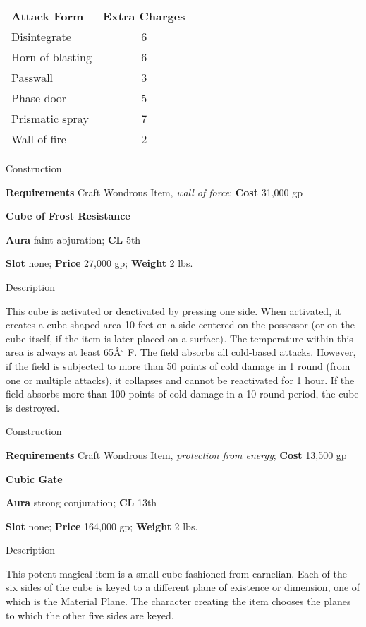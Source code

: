 \begin{tabular}{lc}
\textbf{Attack Form} & \textbf{Extra Charges}\\
Disintegrate & 6\\
Horn of blasting & 6\\
Passwall & 3\\
Phase door & 5\\
Prismatic spray & 7 \\
Wall of fire & 2\\
\end{tabular}
				
Construction
				
\textbf{Requirements} Craft Wondrous Item, \textit{wall of force}; \textbf{Cost }31,000 gp
				
\textbf{Cube of Frost Resistance}
				
\textbf{Aura} faint abjuration;\textbf{ CL }5th
				
\textbf{Slot} none; \textbf{Price} 27,000 gp; \textbf{Weight }2 lbs.
				
Description
				
This cube is activated or deactivated by pressing one side. When activated, it creates a cube-shaped area 10 feet on a side centered on the possessor (or on the cube itself, if the item is later placed on a surface)\textit{. }The temperature within this area is always at least 65\^A\mbox{${}^\circ$} F. The field absorbs all cold-based attacks. However, if the field is subjected to more than 50 points of cold damage in 1 round (from one or multiple attacks), it collapses and cannot be reactivated for 1 hour. If the field absorbs more than 100 points of cold damage in a 10-round period, the cube is destroyed. 
				
Construction
				
\textbf{Requirements} Craft Wondrous Item, \textit{protection from energy}; \textbf{Cost }13,500 gp
				
\textbf{Cubic Gate}
				
\textbf{Aura} strong conjuration;\textbf{ CL }13th
				
\textbf{Slot} none; \textbf{Price} 164,000 gp; \textbf{Weight }2 lbs.
				
Description
				
This potent magical item is a small cube fashioned from carnelian. Each of the six sides of the cube is keyed to a different plane of existence or dimension, one of which is the Material Plane. The character creating the item chooses the planes to which the other five sides are keyed.
				
